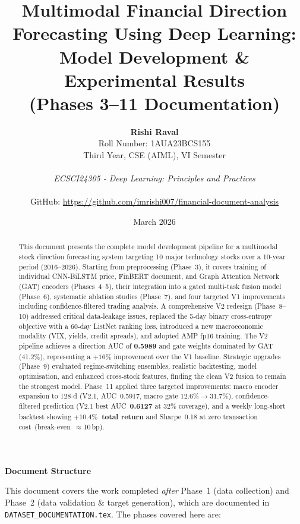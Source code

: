 \documentclass[12pt,a4paper]{article}
\title{\textbf{Multimodal Financial Direction Forecasting Using Deep Learning:\\Model Development \& Experimental Results\\(Phases 3--11 Documentation)}}
\author{
    \textbf{Rishi Raval}\\
    Roll Number: 1AUA23BCS155\\
    Third Year, CSE (AIML), VI Semester\\
    \vspace{0.3cm}\\
    \textit{ECSCI24305 - Deep Learning: Principles and Practices}\\
    \vspace{0.3cm}\\
    \small{GitHub: \url{https://github.com/imrishi007/financial-document-analysis}}
}
\date{March 2026}
\begin{document}
\maketitle

\begin{abstract}
This document presents the complete model development pipeline for a multimodal stock direction forecasting system targeting 10 major technology stocks over a 10-year period (2016--2026). Starting from preprocessing (Phase~3), it covers training of individual CNN-BiLSTM price, FinBERT document, and Graph Attention Network (GAT) encoders (Phases~4--5), their integration into a gated multi-task fusion model (Phase~6), systematic ablation studies (Phase~7), and four targeted V1 improvements including confidence-filtered trading analysis. A comprehensive V2 redesign (Phase~8--10) addressed critical data-leakage issues, replaced the 5-day binary cross-entropy objective with a 60-day ListNet ranking loss, introduced a new macroeconomic modality (VIX, yields, credit spreads), and adopted AMP fp16 training. The V2 pipeline achieves a direction AUC of \textbf{0.5989} and gate weights dominated by GAT (41.2\%), representing a $+16\%$ improvement over the V1 baseline. Strategic upgrades (Phase~9) evaluated regime-switching ensembles, realistic backtesting, model optimisation, and enhanced cross-stock features, finding the clean V2 fusion to remain the strongest model. Phase~11 applied three targeted improvements: macro encoder expansion to 128-d (V2.1, AUC~0.5917, macro gate $12.6\% \to 31.7\%$), confidence-filtered prediction (V2.1 best AUC~\textbf{0.6127} at 32\% coverage), and a weekly long-short backtest showing \textbf{$+10.4\%$~total return} and Sharpe~0.18 at zero transaction cost~(break-even~$\approx$10\,bp).
\end{abstract}

\vspace{0.5cm}

\noindent\textbf{\large Document Structure}

\vspace{0.3cm}
\noindent This document covers the work completed \emph{after} Phase~1 (data collection) and Phase~2 (data validation \& target generation), which are documented in \texttt{DATASET\_DOCUMENTATION.tex}. The phases covered here are:
\end{document}
